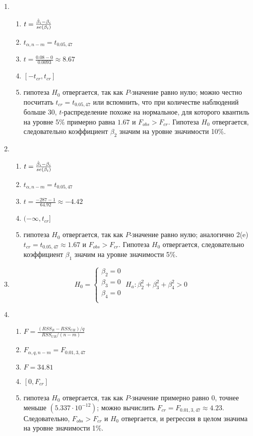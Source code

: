 \begin{problem}
\begin{sol}
\begin{enumerate}
\item
\begin{enumerate}
\item $t=\frac{\hat{\beta}_i-\beta_i}{se(\beta_i)}$
\item $t_{\alpha,n-m}=t_{0.05,47}$
\item $t=\frac{0.08-0}{0.0093}\approx 8.67$
\item $[-t_{cr},t_{cr}]$
\item гипотеза $H_0$ отвергается, так как $P$-значение равно нулю; можно честно посчитать $t_{cr}=t_{0.05,47}$ или вспомнить, что при количестве наблюдений больше 30, $t$-распределение похоже на нормальное, для которого квантиль на уровне 5\% примерно равна $1.67$ и $F_{obs}>F_{cr}$. Гипотеза $H_0$ отвергается, следовательно коэффициент $\beta_2$ значим на уровне значимости 10\%.
\end{enumerate}

\item
\begin{enumerate}
\item $t=\frac{\hat{\beta}_i-\beta_i}{se(\beta_i)}$
\item $t_{\alpha, n-m} = t_{0.05, 47}$
\item $t=\frac{-287-1}{64.92}\approx -4.42$
\item $(-\infty, t_{cr}]$
\item гипотеза $H_0$ отвергается, так как $P$-значение равно нулю; аналогично 2(e) $t_{cr}=t_{0.05,47}\approx 1.67$ и $F_{obs}>F_{cr}$. Гипотеза $H_0$ отвергается, следовательно коэффициент $\beta_1$ значим на уровне значимости 5\%.
\end{enumerate}

\item
\[
H_0=
\begin{cases}
\beta_2=0\\
\beta_3=0\\
\beta_4=0\\
\end{cases}
\;
H_a:\beta_2^2+\beta_3^2+\beta_4^2>0
\]

\item
\begin{enumerate}
\item $F =\frac{(RSS_R-RSS_{UR})/q}{RSS_{UR}/(n-m)}$
\item $F_{\alpha,q,n-m}=F_{0.01,3,47}$
\item $F=34.81$
\item $[0,F_{cr}]$
\item гипотеза $H_0$ отвергается, так как $P$-значение примерно равно $0$, точнее меньше $(5.337\cdot 10^{-12})$; можно вычислить $F_{cr}=F_{0.01,3,47} \approx 4.23$. Следовательно, $F_{obs}>F_{cr}$ и $H_0$ отвергается, и регрессия в целом значима на уровне значимости 1\%.
\end{enumerate}


\end{enumerate}
\end{sol}
\end{problem}
